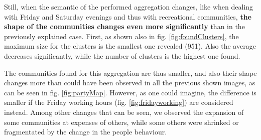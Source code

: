 \documentclass[12pt,a4paper]{article}
\begin{document}
Still, when the semantic of the performed aggregation changes, like when dealing with Friday and Saturday evenings and thus with recreational communities, \textbf{the shape of the communities changes even more significantly} than in the previously explained case.
First, as shown also in fig. \ref{fig:foundClusters}, the maximum size for the clusters is the smallest one revealed (951). Also the average decreases significantly, while the number of clusters is the highest one found.

The communities found for this aggregation are thus smaller, and also their shape changes more than could have been observed in all the previous shown images, as can be seen in fig. \ref{fig:partyMap}. However, as one could imagine, the difference is smaller if the Friday working hours (fig. \ref{fig:fridayworking}) are considered instead.
Among other changes that can be seen, we observed the expansion of some communities at expenses of others, while some others were shrinked or fragmentated by the change in the people behaviour. 
\end{document}
